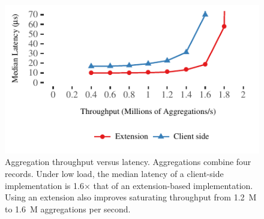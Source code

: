 \begin{figure}[t]
\centering
\includegraphics[width=1.0\columnwidth]{graphs/aggregate.pdf}
  \caption{Aggregation throughput versus latency. Aggregations
    combine four records. Under low
    load, the median latency of a client-side implementation is 1.6$\times$
    that of an extension-based implementation. Using an
    extension also improves saturating throughput from 1.2~M to 1.6~M
    aggregations per second.}
\label{fig:aggregate-bench}
\end{figure}
